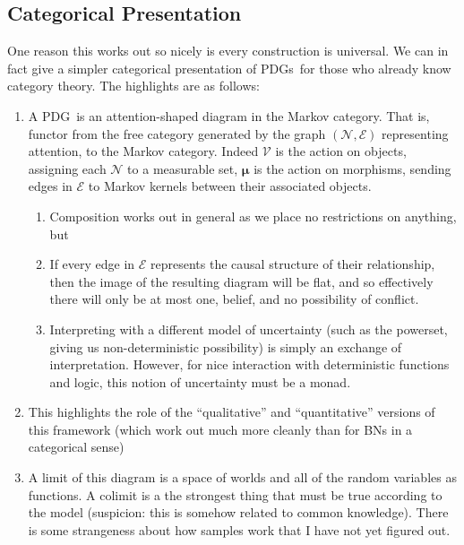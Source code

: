 \documentclass{article}
\newcommand{\bmu}{\boldsymbol{\mu}}
\newcommand{\Ed}{\mathcal E}
\newcommand{\MN}{PDG}
\newcommand{\MNs}{\MN s}
\numberwithin{equation}{section}
\begin{document}
	
	\begin{vcat}
		\section{Categorical Presentation}
		One reason this works out so nicely is every construction is universal. We can in fact give a simpler categorical presentation of \MNs\ for those who already know category theory. The highlights are as follows:
		\begin{enumerate}
			\item A \MN\ is an attention-shaped diagram in the Markov category. That is, functor from the free category generated by the graph $(\mathcal N, \Ed)$ representing attention, to the Markov category. Indeed $\mathcal V$ is the action on objects, assigning each $\mathcal N$ to a measurable set, $\bmu$ is the action on morphisms, sending edges in $\Ed$ to Markov kernels between their associated objects. 
			\begin{enumerate}
				\item Composition works out in general as we place no restrictions on anything, but
				\item If every edge in $\Ed$ represents the causal structure of their relationship, then the image of the resulting diagram will be flat, and so effectively there will only be at most one, belief, and no possibility of conflict.
				\item Interpreting with a different model of uncertainty (such as the powerset, giving us non-deterministic possibility) is simply an exchange of interpretation. However, for nice interaction with deterministic functions and logic, this notion of uncertainty must be a monad.
			\end{enumerate}
			
			\item This highlights the role of the ``qualitative'' and ``quantitative'' versions of this framework (which work out much more cleanly than for BNs in a categorical sense)
			
			\item A limit of this diagram is a space of worlds and all of the random variables as functions. A colimit is a the strongest thing that must be true according to the model (suspicion: this is somehow related to common knowledge). There is some strangeness about how samples work that I have not yet figured out.
		\end{enumerate}
		

\end{vcat}
\end{document}
